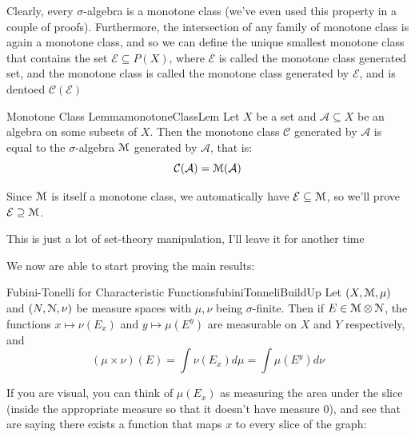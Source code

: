 \documentclass[oneside]{book}
\newcommand{\CA}{\mathcal{A}}
\newcommand{\CE}{\mathcal{E}}
\newcommand{\EM}{\EuScript{M}}
\newcommand{\EN}{\EuScript{N}}
\newcommand{\CC}{\mathcal{C}}
\newcommand{\sse}{\subseteq}
\begin{document}
Clearly, every $\sigma$-algebra is a monotone class (we've even used this property in a couple of proofs). Furthermore,
the intersection of any family of monotone class is again a monotone class, and so we can define the unique smallest
monotone class that contains the set $\CE \sse P(X)$, where $\CE$ is called the monotone class generated set, and the
monotone class is called the monotone class generated by $\CE$, and is dentoed $\CC(\CE)$

\begin{lem}{Monotone Class Lemma}{monotoneClassLem}
	Let $X$ be a set and $\CA \sse X$ be an algebra on some subsets of $X$. Then the monotone class $\CC$ generated by
	$\CA$ is equal to the $\sigma$-algebra $\EM$ generated by $\CA$, that is:
	\[
		\CC(\CA) = \EM(\CA)
	\]
\end{lem}

\begin{Proof}
	Since $\EM$ is itself a monotone class, we automatically have $\CE \sse \EM$, so we'll prove $\CE \supseteq \EM$. 

	This is just a lot of set-theory manipulation, I'll leave it for another time
\end{Proof}

We now are able to start proving the main results:

\begin{thm}{Fubini-Tonelli for Characteristic Functions}{fubiniTonneliBuildUp}
	Let $(X, \EM, \mu)$ and $(N, \EN, \nu)$ be measure spaces with $\mu, \nu$ being $\sigma$-finite. Then if $E \in
	\EM\otimes \EN$, the functions $x\mapsto \nu(E_x)$ and $y \mapsto \mu(E^y)$ are measurable on $X$ and $Y$
	respectively, and
	\[
		(\mu\times \nu)(E) = \int \nu(E_x)d\mu = \int \mu(E^y)d\nu
	\]
\end{thm}

If you are visual, you can think of $\mu(E_x)$ as measuring the area under the slice (inside the appropriate measure so
that it doesn't have measure $0$), and see that are saying there exists a function that maps $x$ to every slice of the
graph:
\end{document}
